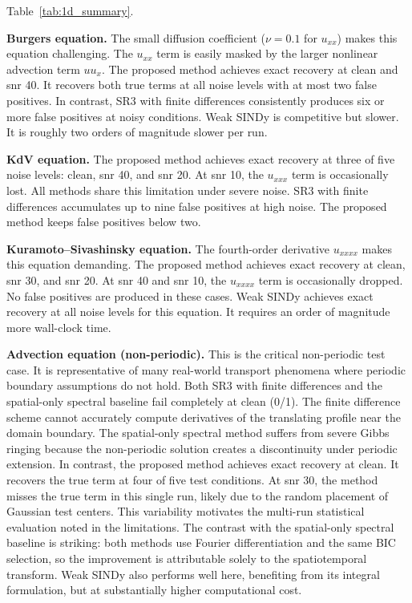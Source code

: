 \documentclass[preprint,12pt]{elsarticle}
\begin{document}
Table~\ref{tab:1d_summary}.

\textbf{Burgers equation.} The small diffusion coefficient ($\nu=0.1$ for $u_{xx}$) makes this equation challenging. The $u_{xx}$ term is easily masked by the larger nonlinear advection term $u u_x$. The proposed method achieves exact recovery at clean and snr 40. It recovers both true terms at all noise levels with at most two false positives. In contrast, SR3 with finite differences consistently produces six or more false positives at noisy conditions. Weak SINDy is competitive but slower. It is roughly two orders of magnitude slower per run.

\textbf{KdV equation.} The proposed method achieves exact recovery at three of five noise levels: clean, snr 40, and snr 20. At snr 10, the $u_{xxx}$ term is occasionally lost. All methods share this limitation under severe noise. SR3 with finite differences accumulates up to nine false positives at high noise. The proposed method keeps false positives below two.

\textbf{Kuramoto--Sivashinsky equation.} The fourth-order derivative $u_{xxxx}$ makes this equation demanding. The proposed method achieves exact recovery at clean, snr 30, and snr 20. At snr 40 and snr 10, the $u_{xxxx}$ term is occasionally dropped. No false positives are produced in these cases. Weak SINDy achieves exact recovery at all noise levels for this equation. It requires an order of magnitude more wall-clock time.

\textbf{Advection equation (non-periodic).} This is the critical non-periodic test case. It is representative of many real-world transport phenomena where periodic boundary assumptions do not hold. Both SR3 with finite differences and the spatial-only spectral baseline fail completely at clean (0/1). The finite difference scheme cannot accurately compute derivatives of the translating profile near the domain boundary. The spatial-only spectral method suffers from severe Gibbs ringing because the non-periodic solution creates a discontinuity under periodic extension. In contrast, the proposed method achieves exact recovery at clean. It recovers the true term at four of five test conditions. At snr 30, the method misses the true term in this single run, likely due to the random placement of Gaussian test centers. This variability motivates the multi-run statistical evaluation noted in the limitations. The contrast with the spatial-only spectral baseline is striking: both methods use Fourier differentiation and the same BIC selection, so the improvement is attributable solely to the spatiotemporal transform. Weak SINDy also performs well here, benefiting from its integral formulation, but at substantially higher computational cost.
\end{document}
